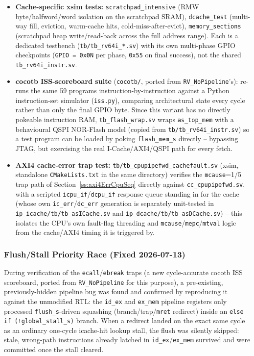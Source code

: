 \begin{itemize}
  \item \textbf{Cache-specific xsim tests:} \texttt{scratchpad\_intensive}
    (RMW byte/halfword/word isolation on the scratchpad SRAM),
    \texttt{dcache\_test} (multi-way fill, eviction, warm-cache hits,
    cold-miss-after-evict), \texttt{memory\_sections} (scratchpad heap
    write/read-back across the full address range). Each is a dedicated
    testbench (\texttt{tb/tb\_rv64i\_*.sv}) with its own multi-phase GPIO
    checkpoints (\texttt{GPIO\,=\,0x0N} per phase, \texttt{0x55} on final
    success), not the shared \texttt{tb\_rv64i\_instr.sv}.
  \item \textbf{cocotb ISS-scoreboard suite} (\texttt{cocotb/}, ported from
    \texttt{RV\_NoPipeline}'s): re-runs the same 59 programs
    instruction-by-instruction against a Python instruction-set simulator
    (\texttt{iss.py}), comparing architectural state every cycle rather
    than only the final GPIO byte. Since this variant has no directly
    pokeable instruction RAM, \texttt{tb\_flash\_wrap.sv} wraps
    \texttt{as\_top\_mem} with a behavioural QSPI NOR-Flash model (copied
    from \texttt{tb/tb\_rv64i\_instr.sv}) so a test program can be loaded
    by poking \texttt{flash\_mem\_s} directly -- bypassing JTAG, but
    exercising the real I-Cache/AXI4/QSPI path for every fetch.
  \item \textbf{AXI4 cache-error trap test:}
    \texttt{tb/tb\_cpupipefwd\_cachefault.sv} (xsim, standalone
    \texttt{CMakeLists.txt} in the same directory) verifies the
    \texttt{mcause}=1/5 trap path of Section~\ref{ss:axi4ErrCpuSeq}
    directly against \texttt{cc\_cpupipefwd.sv}, with a scripted
    \texttt{icpu\_if}/\texttt{dcpu\_if} response queue standing in for the
    cache (whose own \texttt{ic\_err}/\texttt{dc\_err} generation is
    separately unit-tested in \texttt{ip\_icache/tb/tb\_asICache.sv} and
    \texttt{ip\_dcache/tb/tb\_asDCache.sv}) -- this isolates the CPU's own
    fault-flag threading and \texttt{mcause}/\texttt{mepc}/\texttt{mtval}
    logic from the cache/AXI4 timing it is triggered by.
\end{itemize}

\subsubsection{Flush/Stall Priority Race (Fixed 2026-07-13)}
\label{subsubsec:flushStallRace}

During verification of the \texttt{ecall}/\texttt{ebreak} traps (a new
cycle-accurate cocotb ISS scoreboard, ported from \texttt{RV\_NoPipeline}
for this purpose), a pre-existing, previously-hidden pipeline bug was
found and confirmed by reproducing it against the unmodified RTL: the
\texttt{id\_ex} and \texttt{ex\_mem} pipeline registers only processed
\texttt{flush\_s}-driven squashing (branch/trap/\texttt{mret} redirect)
inside an \texttt{else if (!global\_stall\_s)} branch. When a redirect
landed on the exact same cycle as an ordinary one-cycle icache-hit lookup
stall, the flush was silently skipped: stale, wrong-path instructions
already latched in \texttt{id\_ex}/\texttt{ex\_mem} survived and were
committed once the stall cleared.

